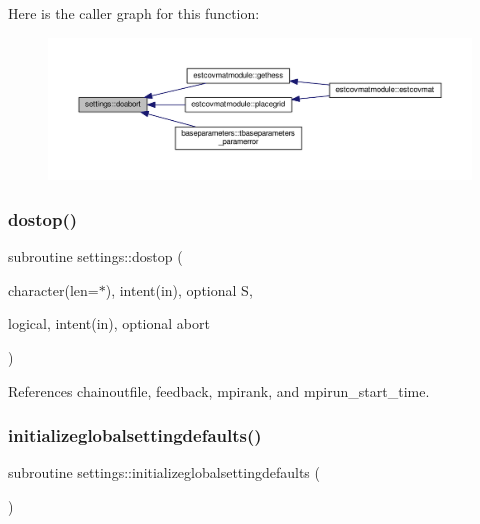 Here is the caller graph for this function\+:
\nopagebreak
\begin{figure}[H]
\begin{center}
\leavevmode
\includegraphics[width=350pt]{namespacesettings_afa3df86ab753e05244ab370242ab2e5a_icgraph}
\end{center}
\end{figure}
\mbox{\label{namespacesettings_a3747d2293e80aacbc1e756c2d26fc75f}} 
\subsubsection{\texorpdfstring{dostop()}{dostop()}}
{\footnotesize\ttfamily subroutine settings\+::dostop (\begin{DoxyParamCaption}\item[{character(len=$\ast$), intent(in), optional}]{S,  }\item[{logical, intent(in), optional}]{abort }\end{DoxyParamCaption})}



References chainoutfile, feedback, mpirank, and mpirun\+\_\+start\+\_\+time.

\mbox{\label{namespacesettings_a10f55aa94b2ab604c1c3769a46fc6981}} 
\subsubsection{\texorpdfstring{initializeglobalsettingdefaults()}{initializeglobalsettingdefaults()}}
{\footnotesize\ttfamily subroutine settings\+::initializeglobalsettingdefaults (\begin{DoxyParamCaption}{ }\end{DoxyParamCaption})}



